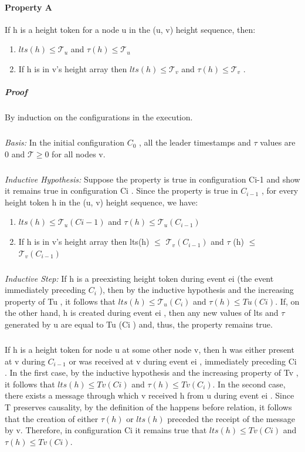 \paragraph{Property A} If h is a height token for a node u in the (u, v) height sequence, then:
\begin{enumerate}
	\item $lts(h) \leq \mathcal{T} _u$ and $\tau (h) \leq \mathcal{T} _u$
	\item If h is in v's height array then $lts(h) \leq \mathcal{T} _v$ and $\tau (h) \leq \mathcal{T} _v$ .
\end{enumerate}

\subparagraph{Proof}By induction on the configurations in the execution.
\subparagraph{}\textit{Basis:} In the initial configuration $C_0$ , all the leader timestamps and $\tau$ values are 0 and $\mathcal{T} \geq 0$ for all nodes v.
\subparagraph{}\textit{Inductive Hypothesis:} Suppose the property is true in configuration Ci-1 and show it remains true in configuration Ci . Since the property is true in $C_{i-1}$ , for every height token h in the (u, v) height sequence, we have:
\begin{enumerate} [label=(\roman*)]
	\item $lts(h) \leq \mathcal{T} _u(Ci-1)$ and $\tau (h) \leq \mathcal{T} _u(C_{i-1})$
	\item If h is in v's height array then lts(h) $\leq$ $\mathcal{T} _v(C_{i-1})$ and $\tau$ (h) $\leq$ $\mathcal{T} _v (C_{i-1})$
\end{enumerate}
\subparagraph{}\textit{Inductive Step:} If h is a preexisting height token during event ei (the event immediately preceding $C_i$ ), then by the inductive hypothesis and the increasing property of Tu , it follows that $lts(h) \leq \mathcal{T} _u (C_i )$ and $\tau (h) \leq Tu (Ci )$. If, on the other hand, h is created during event ei , then any new values of lts and $\tau$ generated by u are equal to Tu (Ci ) and, thus, the property remains true.
\subparagraph{}If h is a height token for node u at some other node v, then h was either present at v during $C_{i-1}$ or was received at v during event ei , immediately preceding Ci . In the first case, by the inductive hypothesis and the increasing property of Tv , it follows that $lts(h) \leq Tv (Ci )$ and $\tau (h) \leq Tv (C_i )$. In the second case, there exists a message through which v received h from u during event ei . Since T preserves causality, by the definition of the happens before relation, it follows that the creation of either $\tau (h)$ or $lts(h)$ preceded the receipt of the message by v. Therefore, in configuration Ci it remains true that $lts(h) \leq Tv (Ci )$ and $\tau (h) \leq Tv (Ci )$.

